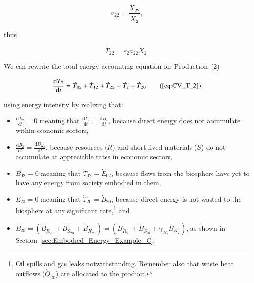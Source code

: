 \begin{equation} \label{eq:io_ratio_single_sector}
	a_{22} = \frac{\dot{X}_{22}}{\dot{X}_{2}},
\end{equation}

\noindent{}thus

\begin{equation} \label{eq:T_dot_11_single_sector}
	\dot{T}_{22} = \varepsilon_{2}a_{22}\dot{X}_{2}.
\end{equation}

We can rewrite the total energy accounting equation 
for Production~(2)

\begin{equation}
	\frac{\mathrm{d}T_{2}}{\mathrm{d}t} 	 
	= \dot{T}_{02} 
	+ \dot{T}_{12}
	+ \dot{T}_{22} 
	- \dot{T}_{2} 
	- \dot{T}_{20} \tag{\ref{eq:CV_T_2}}
\end{equation}

\noindent{}using energy intensity by realizing that:

\begin{itemize}
	\item{$\frac{\mathrm{d}E_2}{\mathrm{d}t} = 0$
		meaning that
		$\frac{\mathrm{d}T_2}{\mathrm{d}t} = \frac{\mathrm{d}B_2}{\mathrm{d}t}$, 
		because direct energy
		does not accumulate within economic sectors,}
	\item{$\frac{\mathrm{d}B_2}{\mathrm{d}t} = \frac{\mathrm{d}B_{K_{2}}}{\mathrm{d}t}$,
		because resources ($R$) and short-lived materials ($S$) do not 
		accumulate at appreciable rates in economic sectors,}
	\item{$\dot{B}_{02} = 0$ meaning that $\dot{T}_{02} = \dot{E}_{02}$,
		because flows from the biosphere have yet to have any energy from society embodied in them,
		}
	\item{$\dot{E}_{20} = 0$ meaning that $\dot{T}_{20} = \dot{B}_{20}$, 
	because direct energy is not wasted to the biosphere at any significant rate,\footnote{Oil
	spills and gas leaks notwithstanding. Remember also that waste heat outflows ($\dot{Q}_{20}$)
	are allocated to the product.} and} 
	\item{$\dot{B}_{20} = \left( \dot{B}_{\dot{R}_{20}} 
							+ \dot{B}_{\dot{S}_{20}}
							+ \dot{B}_{\dot{K}_{20}}
							\right)
						= \left( \dot{B}_{\dot{R}_{20}} 
							+ \dot{B}_{\dot{S}_{20}}
							+ \gamma_{B_{2}} B_{K_{2}}
							\right)$, as shown in Section~\ref{sec:Embodied_Energy_Example_C}.}
\end{itemize}

